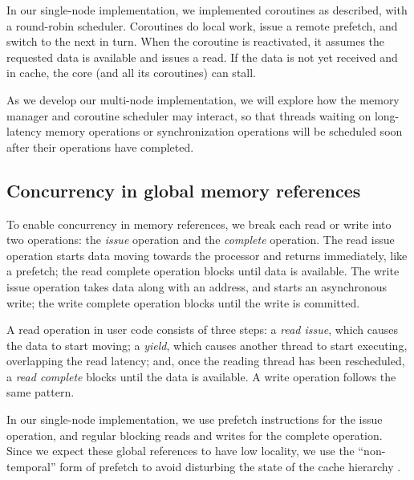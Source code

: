 \documentclass[10pt,nocopyrightspace,preprint]{sigplanconf}
\begin{document}
In our single-node implementation, we implemented coroutines
as described, with a round-robin scheduler. Coroutines do local work,
issue a remote prefetch, and switch to the next in turn.  When the
coroutine is reactivated, it assumes the requested data is available
and issues a read.  If the data is not yet received and in cache, the core
(and all its coroutines) can stall.

As we develop our multi-node implementation, we will explore how the memory manager and coroutine scheduler may
interact, so that threads waiting on long-latency memory operations or
synchronization operations will be scheduled soon after their
operations have completed.

\subsection{Concurrency in global memory references}

To enable concurrency in memory references, we break each read or
write into two operations: the {\em issue} operation and the {\em
  complete} operation. The read issue operation starts data moving
towards the processor and returns immediately, like a prefetch; the
read complete operation blocks until data is available. The write
issue operation takes data along with an address, and starts an
asynchronous write; the write complete operation blocks until the
write is committed.

A read operation in user code consists of three steps: a {\em read
  issue}, which causes the data to start moving; a {\em yield}, which
causes another thread to start executing, overlapping the read
latency; and, once the reading thread has been rescheduled, a {\em
  read complete} blocks until the data is available. A write operation
follows the same pattern.

In our single-node implementation, we use prefetch instructions for the issue operation, and regular
blocking reads and writes for the complete operation.  Since we expect
these global references to have low locality, we use the
``non-temporal'' form of prefetch to avoid disturbing the state of the
cache hierarchy \cite{intel:swdev}.
\end{document}
